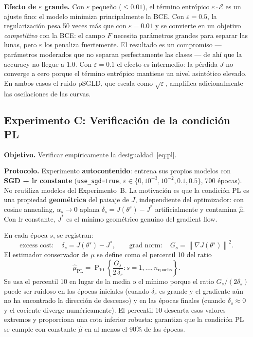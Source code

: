 \documentclass[11pt, a4paper]{article}
\theoremstyle{definition}
\newcommand{\norm}[1]{\left\|#1\right\|}
\begin{document}
\textbf{Efecto de $\varepsilon$ grande.}
Con $\varepsilon$ pequeño ($\leq 0.01$), el término entrópico $\varepsilon\cdot\mathcal{E}$
es un ajuste fino: el modelo minimiza principalmente la BCE.
Con $\varepsilon = 0.5$, la regularización pesa 50 veces más que con $\varepsilon=0.01$
y se convierte en un objetivo \emph{competitivo} con la BCE: el campo $F$ necesita
parámetros grandes para separar las lunas, pero $\varepsilon$ los penaliza
fuertemente. El resultado es un compromiso — parámetros moderados que no
separan perfectamente las clases — de ahí que la accuracy no llegue a $1.0$.
Con $\varepsilon = 0.1$ el efecto es intermedio: la pérdida $J$ no converge a
cero porque el término entrópico mantiene un nivel asintótico elevado.
En ambos casos el ruido pSGLD, que escala como $\sqrt{\varepsilon}$, amplifica
adicionalmente las oscilaciones de las curvas.

\subsection{Experimento C: Verificación de la condición PL}

\textbf{Objetivo.} Verificar empíricamente la desigualdad~\eqref{eq:pl}.

\textbf{Protocolo.} Experimento \textbf{autocontenido}: entrena sus propios
modelos con \textbf{SGD + lr constante} (\texttt{use\_sgd=True},
$\varepsilon \in \{0, 10^{-3}, 10^{-2}, 0.1, 0.5\}$, 700 épocas). No
reutiliza modelos del Experimento~B. La motivación es que la condición PL es
una propiedad \textbf{geométrica} del paisaje de $J$, independiente del
optimizador: con cosine annealing, $\alpha_s \to 0$ aplana $\delta_s =
J(\theta^s) - J^*$ artificialmente y contamina $\hat{\mu}$. Con lr constante,
$J^*$ es el mínimo geométrico genuino del gradient flow.

En cada época $s$, se registran:
\begin{equation}
  \text{excess cost}: \quad \delta_s = J(\theta^s) - J^*,
  \qquad
  \text{grad norm}: \quad G_s = \norm{\nabla J(\theta^s)}^2.
\end{equation}
El estimador conservador de $\mu$ se define como el percentil 10 del ratio
\begin{equation}
  \hat{\mu}_{\text{PL}} = \operatorname{P}_{10}\!\left\{
    \frac{G_s}{2\,\delta_s} : s = 1, \ldots, n_\text{epochs}
  \right\}.
\end{equation}
Se usa el percentil 10 en lugar de la media o el mínimo porque el ratio
$G_s/(2\delta_s)$ puede ser ruidoso en las épocas iniciales (cuando $\delta_s$
es grande y el gradiente aún no ha encontrado la dirección de descenso) y en
las épocas finales (cuando $\delta_s \approx 0$ y el cociente diverge
numéricamente). El percentil 10 descarta esos valores extremos y proporciona
una cota inferior robusta: garantiza que la condición PL se cumple con
constante $\hat{\mu}$ en al menos el $90\%$ de las épocas.
\end{document}
